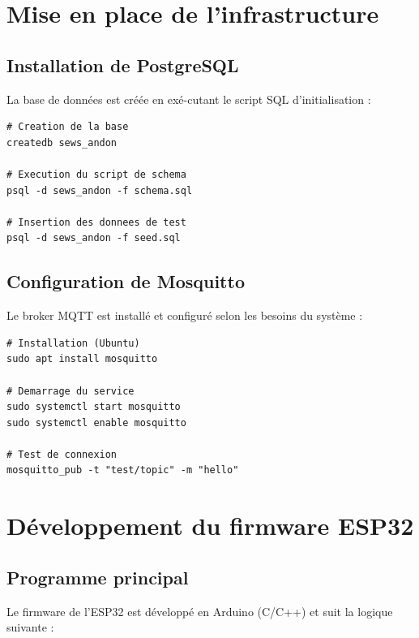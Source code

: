 \section{Mise en place de l'infrastructure}

\subsection{Installation de PostgreSQL}

La base de donn\'ees est cr\'e\'ee en ex\'e-cutant le script SQL d'initialisation :

\begin{lstlisting}[caption={Initialisation de la base de donn\'ees},label={lst:init_db}]
# Creation de la base
createdb sews_andon

# Execution du script de schema
psql -d sews_andon -f schema.sql

# Insertion des donnees de test
psql -d sews_andon -f seed.sql
\end{lstlisting}

\subsection{Configuration de Mosquitto}

Le broker MQTT est install\'e et configur\'e selon les besoins du syst\`eme :

\begin{lstlisting}[caption={Installation de Mosquitto},label={lst:install_mosquitto}]
# Installation (Ubuntu)
sudo apt install mosquitto

# Demarrage du service
sudo systemctl start mosquitto
sudo systemctl enable mosquitto

# Test de connexion
mosquitto_pub -t "test/topic" -m "hello"
\end{lstlisting}

\section{D\'eveloppement du firmware ESP32}

\subsection{Programme principal}

Le firmware de l'ESP32 est d\'evelopp\'e en Arduino (C/C++) et suit la logique suivante :

